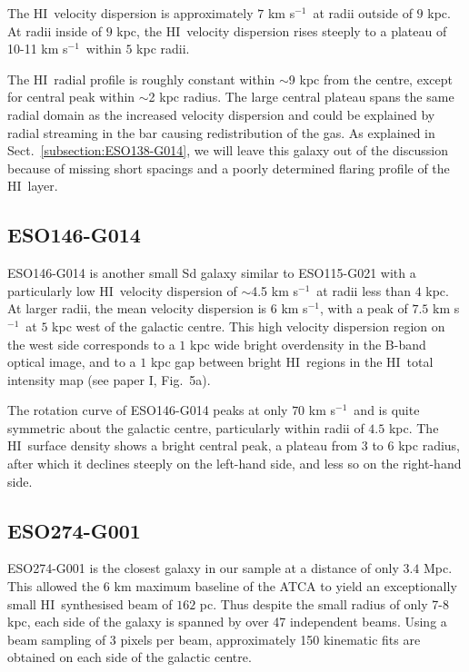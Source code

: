 \documentclass[traditabstract]{aa} %
\newcommand\HI{H{\small I}}
\newcommand\kms{km s$^{-1}$}
\begin{document}
The \HI\ velocity dispersion is approximately $7$ \kms\ at radii outside
of $9$ kpc. At radii inside of $9$ kpc, the \HI\ velocity dispersion
rises steeply to a plateau of 10-11 \kms\ within $5$ kpc radii.

The \HI\ radial profile is roughly constant within $\sim$9 kpc from the
centre, except for central peak within $\sim$2 kpc radius. The large
central plateau spans the same radial domain as the increased
velocity dispersion and could be explained by radial streaming in the bar
causing redistribution of the gas. As explained in 
Sect.~\ref{subsection:ESO138-G014}, we will leave this galaxy out of the
discussion because of missing short spacings and a poorly determined flaring
profile of the \HI\ layer.



\subsection{ESO146-G014}

ESO146-G014 is another small Sd galaxy similar to ESO115-G021 with a
particularly low \HI\ velocity dispersion of $\sim$4.5 \kms\ at radii
less than $4$ kpc. At larger radii, the mean velocity dispersion is
$6$ \kms, with a peak of $7.5$ \kms\ at $5$ kpc west of the
galactic centre. This high velocity dispersion region on the west side
corresponds to a $1$ kpc wide bright overdensity in the B-band optical
image, and to a $1$ kpc gap between bright \HI\ regions in the \HI\
total intensity map (see paper I, Fig.~5a).

The rotation curve of ESO146-G014 peaks at only $70$ \kms\ and is quite
symmetric about the galactic centre, particularly within radii of $4.5$
kpc. The \HI\ surface density shows a bright central peak, a plateau from $3$ to $6$ kpc
radius, after which it declines steeply on the left-hand side, and less so on
the right-hand side.



\subsection{ESO274-G001}

ESO274-G001 is the closest galaxy in our sample at a distance of only
$3.4$ Mpc. This allowed the $6$ km maximum baseline of the ATCA to
yield an exceptionally small \HI\ synthesised beam of $162$ pc. Thus
despite the small radius of only 7-8 kpc, each side of the galaxy is
spanned by over 47 independent beams. Using a beam sampling of 3
pixels per beam, approximately 150 kinematic fits are obtained on each
side of the galactic centre.
\end{document}
